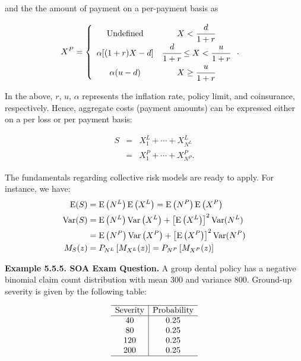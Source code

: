 \documentclass[]{book}
\theoremstyle{definition}
\theoremstyle{definition}
\theoremstyle{definition}
\theoremstyle{remark}
\begin{document}
and the the amount of payment on a per-payment basis as

\begin{eqnarray*}
    X^{P}&=\left\{
      \begin{array}{cc}
        {\rm Undefined} & X<\cfrac{d}{1+r} \\
        \alpha[(1+r)X-d] & \cfrac{d}{1+r}\leq X<\cfrac{u}{1+r} \\
        \alpha(u-d) &  X \ge \cfrac{u}{1+r}\\
      \end{array}
\right..
\end{eqnarray*}

In the above, \(r\), \(u\), \(\alpha\) represents the inflation rate,
policy limit, and coinsurance, respectively. Hence, aggregate costs
(payment amounts) can be expressed either on a per loss or per payment
basis:

\begin{eqnarray*}
S &=& X^L_1 + \cdots + X^L_{N^L} \\
&=&X^P_1 + \cdots + X^P_{N^P} .
\end{eqnarray*}

The fundamentals regarding collective risk models are ready to apply.
For instance, we have: \[\begin{aligned}
  {\rm E}(S) &= {\rm E}\left(N^L\right) {\rm E}\left(X^L\right) = {\rm E}\left(N^P\right) {\rm E}\left(X^P\right)\\
  {\rm Var}(S) &= {\rm E}\left(N^L\right) {\rm Var}\left(X^L\right) + \left[{\rm E}\left(X^L\right)\right]^2 {\rm Var}(N^L) \\
  &= {\rm E}\left(N^P\right) {\rm Var}\left(X^P\right) + \left[{\rm E}\left(X^P\right)\right]^2 {\rm Var}(N^P)\\
  M_S(z)&=P_{N^L}\left[M_{X^L}(z)\right]=P_{N^P}\left[M_{X^P}(z)\right]
\end{aligned}\]

\textbf{Example 5.5.5. SOA Exam Question.} A group dental policy has a
negative binomial claim count distribution with mean 300 and variance
800. Ground-up severity is given by the following table:

\[\begin{matrix}
  \begin{array}{ c | c }
    \hline
      \text{Severity} & \text{Probability}\\ \hline
    40 & 0.25\\
    80 & 0.25\\
    120 & 0.25\\
    200 & 0.25\\
    \hline
  \end{array}
\end{matrix}\]
\end{document}
